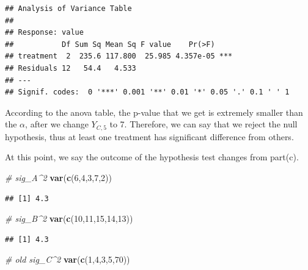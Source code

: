 \documentclass[
]{article}
\newenvironment{Shaded}{\begin{snugshade}}{\end{snugshade}}
\newcommand{\CommentTok}[1]{\textcolor[rgb]{0.56,0.35,0.01}{\textit{#1}}}
\newcommand{\DecValTok}[1]{\textcolor[rgb]{0.00,0.00,0.81}{#1}}
\newcommand{\KeywordTok}[1]{\textcolor[rgb]{0.13,0.29,0.53}{\textbf{#1}}}
\newcommand{\NormalTok}[1]{#1}
\begin{document}
\begin{verbatim}
## Analysis of Variance Table
## 
## Response: value
##           Df Sum Sq Mean Sq F value    Pr(>F)    
## treatment  2  235.6 117.800  25.985 4.357e-05 ***
## Residuals 12   54.4   4.533                      
## ---
## Signif. codes:  0 '***' 0.001 '**' 0.01 '*' 0.05 '.' 0.1 ' ' 1
\end{verbatim}

According to the anova table, the p-value that we get is extremely
smaller than the \(\alpha\), after we change \(Y_{C,5}\) to 7.
Therefore, we can say that we reject the null hypothesis, thus at least
one treatment has significant difference from others.

At this point, we say the outcome of the hypothesis test changes from
part(c).

\begin{Shaded}
\begin{Highlighting}[]
\CommentTok{# sig_A^2}
\KeywordTok{var}\NormalTok{(}\KeywordTok{c}\NormalTok{(}\DecValTok{6}\NormalTok{,}\DecValTok{4}\NormalTok{,}\DecValTok{3}\NormalTok{,}\DecValTok{7}\NormalTok{,}\DecValTok{2}\NormalTok{))}
\end{Highlighting}
\end{Shaded}

\begin{verbatim}
## [1] 4.3
\end{verbatim}

\begin{Shaded}
\begin{Highlighting}[]
\CommentTok{# sig_B^2}
\KeywordTok{var}\NormalTok{(}\KeywordTok{c}\NormalTok{(}\DecValTok{10}\NormalTok{,}\DecValTok{11}\NormalTok{,}\DecValTok{15}\NormalTok{,}\DecValTok{14}\NormalTok{,}\DecValTok{13}\NormalTok{))}
\end{Highlighting}
\end{Shaded}

\begin{verbatim}
## [1] 4.3
\end{verbatim}

\begin{Shaded}
\begin{Highlighting}[]
\CommentTok{# old sig_C^2}
\KeywordTok{var}\NormalTok{(}\KeywordTok{c}\NormalTok{(}\DecValTok{1}\NormalTok{,}\DecValTok{4}\NormalTok{,}\DecValTok{3}\NormalTok{,}\DecValTok{5}\NormalTok{,}\DecValTok{70}\NormalTok{))}
\end{Highlighting}
\end{Shaded}
\end{document}
